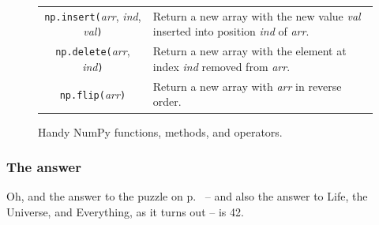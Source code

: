 \begin{figure}[ht]
\begin{tabular}{c|p{3.1in}}
\texttt{np.insert(}\textsl{arr}, \textsl{ind}, \textsl{val}\texttt{)} &
    Return a new array with the new value \textsl{val} inserted into position \textsl{ind} of \textsl{arr}. \\

\texttt{np.delete(}\textsl{arr}, \textsl{ind}\texttt{)} &
    Return a new array with the element at index \textsl{ind} removed from \textsl{arr}. \\

\texttt{np.flip(}\textsl{arr}\texttt{)} &
    Return a new array with \textsl{arr} in reverse order. \\
\end{tabular}
\bigskip
\caption{Handy NumPy functions, methods, and operators.}
\label{fig:handyNumPy}
\end{figure}

\pagebreak
\bigskip
\subsubsection{The answer}

Oh, and the answer to the puzzle on p.~\pageref{indexTest} -- and also the
answer to Life, the Universe, and Everything, as it turns out -- is 42.

